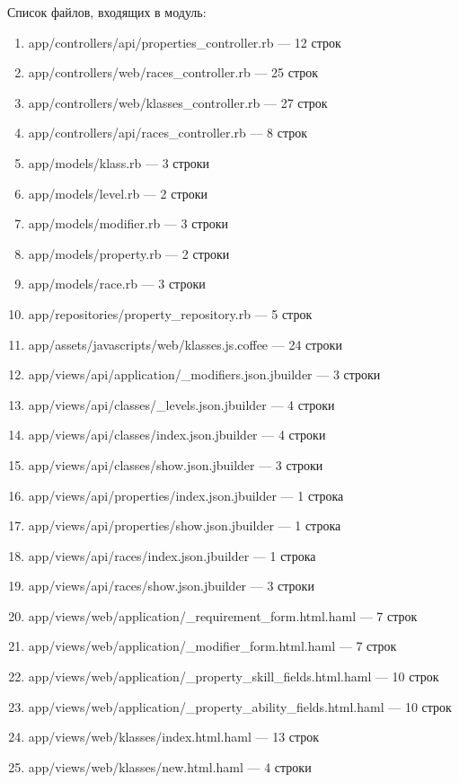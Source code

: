 Список файлов, входящих в модуль:
\begin{enumerate}[label=\arabic*)]
\item app/controllers/api/properties\_controller.rb --- 12 строк
\item app/controllers/web/races\_controller.rb --- 25 строк
\item app/controllers/web/klasses\_controller.rb --- 27 строк
\item app/controllers/api/races\_controller.rb --- 8 строк
\item app/models/klass.rb --- 3 строки
\item app/models/level.rb --- 2 строки
\item app/models/modifier.rb --- 3 строки
\item app/models/property.rb --- 2 строки
\item app/models/race.rb --- 3 строки
\item app/repositories/property\_repository.rb --- 5 строк
\item app/assets/javascripts/web/klasses.js.coffee --- 24 строки
\item app/views/api/application/\_modifiers.json.jbuilder --- 3 строки
\item app/views/api/classes/\_levels.json.jbuilder --- 4 строки
\item app/views/api/classes/index.json.jbuilder --- 4 строки
\item app/views/api/classes/show.json.jbuilder --- 3 строки
\item app/views/api/properties/index.json.jbuilder --- 1 строка
\item app/views/api/properties/show.json.jbuilder --- 1 строка
\item app/views/api/races/index.json.jbuilder --- 1 строка
\item app/views/api/races/show.json.jbuilder --- 3 строки
\item app/views/web/application/\_requirement\_form.html.haml --- 7 строк
\item app/views/web/application/\_modifier\_form.html.haml --- 7 строк
\item app/views/web/application/\_property\_skill\_fields.html.haml --- 10 строк
\item app/views/web/application/\_property\_ability\_fields.html.haml --- 10 строк
\item app/views/web/klasses/index.html.haml --- 13 строк
\item app/views/web/klasses/new.html.haml --- 4 строки

\end{enumerate}
